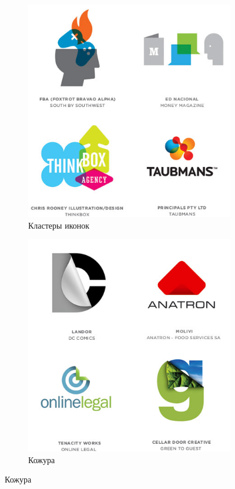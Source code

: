 \begin{figure}[h!]
  \ContinuedFloat
  \centering
  \begin{subfigure}{.45\textwidth}
    \centering
    \includegraphics[width=\linewidth]{images/supplement/logolounge/2012/Klasteri-ikonok.jpeg}
    \caption[]{Кластеры иконок}
    \label{fig:logolounge:2012:klasteri-ikonok}
  \end{subfigure}
  \hfill
  \centering
  \begin{subfigure}{.45\textwidth}
    \centering
    \includegraphics[width=\linewidth]{images/supplement/logolounge/2012/Kojura}
    \caption[]{Кожура}
    \label{fig:logolounge:2012:kojura}
  \end{subfigure}


\end{figure}
